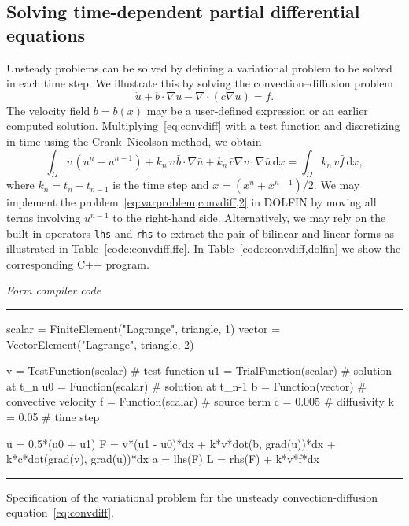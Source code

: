 \documentclass[acmtoms]{acmtrans2m}
\newenvironment{ffccode}[1]{\center\minipage{#1\textwidth}\footnotesize\hfill\it Form compiler code \rm\vspace{0.1cm}\hrule\renewcommand{\baselinestretch}{0.9}\footnotesize\verbatim}{\endverbatim\hrule\normalsize\endminipage\newline\endcenter}
\newcommand{\dx}{\,\mathrm{d}x}
\newcommand{\emp}[1]{\texttt{#1}}
\newcommand{\dolfin}{DOLFIN}
\begin{document}
\subsection{Solving time-dependent partial differential equations}
\label{sec:convection-diffusion}
Unsteady problems can be solved by defining a variational problem to
be solved in each time step. We illustrate this by solving the
convection--diffusion problem
\begin{equation} \label{eq:convdiff}
  \dot{u} + b \cdot \nabla u - \nabla \cdot (c \nabla u) = f.
\end{equation}
The velocity field $b = b(x)$ may be a user-defined expression or an
earlier computed solution. Multiplying~\eqref{eq:convdiff} with a test
function and discretizing in time using the Crank--Nicolson method,
we obtain
\begin{equation} \label{eq:varproblem,convdiff,2}
  \int_{\Omega} v \, (u^{n} - u^{n-1})
  + k_n \, v \, \bar{b} \cdot \nabla \bar{u}
  + k_n \, \bar{c} \nabla v \cdot \nabla \bar{u} \dx
 = \int_{\Omega} k_n \, v \bar{f} \dx,
\end{equation}
where $k_n = t_{n} - t_{n-1}$ is the time step and
$\bar{x} = (x^{n} + x^{n-1})/2$.  We may implement the
problem~\eqref{eq:varproblem,convdiff,2} in \dolfin{} by moving all
terms involving $u^{n-1}$ to the right-hand side. Alternatively, we
may rely on the built-in operators \emp{lhs} and \emp{rhs} to
extract the pair of bilinear and linear forms as illustrated in
Table~\ref{code:convdiff,ffc}. In Table~\ref{code:convdiff,dolfin} we
show the corresponding C++ program.
\begin{table}
\begin{ffccode}{0.9}
scalar = FiniteElement("Lagrange", triangle, 1)
vector = VectorElement("Lagrange", triangle, 2)

v  = TestFunction(scalar)  # test function
u1 = TrialFunction(scalar) # solution at t_n
u0 = Function(scalar)      # solution at t_{n-1}
b  = Function(vector)      # convective velocity
f  = Function(scalar)      # source term
c  = 0.005                 # diffusivity
k  = 0.05                  # time step

u = 0.5*(u0 + u1)
F = v*(u1 - u0)*dx + k*v*dot(b, grad(u))*dx + k*c*dot(grad(v), grad(u))*dx
a = lhs(F)
L = rhs(F) + k*v*f*dx
\end{ffccode}
\caption{Specification of the variational problem for the unsteady
convection-diffusion equation~\eqref{eq:convdiff}.}
\label{code:convdiff,ffc}
\end{table}
\end{document}

